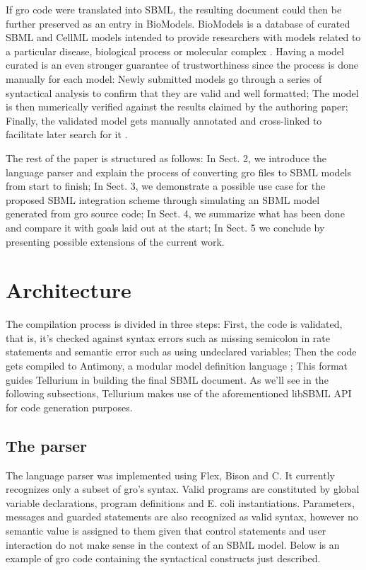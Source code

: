 \documentclass[12pt]{article}
\begin{document}
    If gro code were translated into SBML, the resulting document could then be further preserved as an entry in BioModels. BioModels is a database of curated SBML and CellML models intended to provide researchers with models related to a particular disease, biological process or molecular complex \cite{LeNovere2006}. Having a model curated is an even stronger guarantee of trustworthiness since the process is done manually for each model: Newly submitted models go through a series of syntactical analysis to confirm that they are valid and well formatted; The model is then numerically verified against the results claimed by the authoring paper; Finally, the validated model gets manually annotated and cross-linked to facilitate later search for it \cite{LeNovere2006}.
    
    The rest of the paper is structured as follows: In Sect. 2, we introduce the language parser and explain the process of converting gro files to SBML models from start to finish; In Sect. 3, we demonstrate a possible use case for the proposed SBML integration scheme through simulating an SBML model generated from gro source code; In Sect. 4, we summarize what has been done and compare it with goals laid out at the start; In Sect. 5 we conclude by presenting possible extensions of the current work.
    

\section{Architecture}

    
    The compilation process is divided in three steps: First, the code is validated, that is, it's checked against syntax errors such as missing semicolon in rate statements and semantic error such as using undeclared variables; Then the code gets compiled to Antimony, a modular model definition language \cite{Smith2009}; This format guides Tellurium in building the final SBML document. As we'll see in the following subsections, Tellurium makes use of the aforementioned libSBML API for code generation purposes.


\subsection{The parser}
    
    The language parser was implemented using Flex, Bison and C. It currently recognizes only a subset of gro's syntax. Valid programs are constituted by global variable declarations, program definitions and E. coli instantiations. Parameters, messages and guarded statements are also recognized as valid syntax, however no semantic value is assigned to them given that control statements and user interaction do not make sense in the context of an SBML model. Below is an example of gro code containing the syntactical constructs just described.
\end{document}
